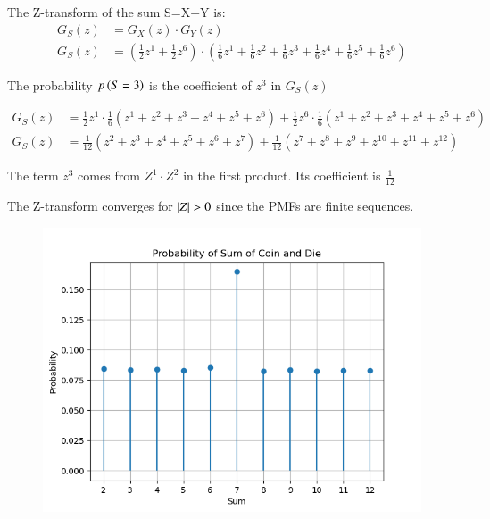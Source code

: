 \documentclass[journal]{IEEEtran}
\begin{document}
The Z-transform of the sum S=X+Y is:
\begin{align}
G_S(z) &= G_X(z) \cdot G_Y(z)\\
G_S(z) &= \left(\frac{1}{2}z^1 + \frac{1}{2}z^6\right) \cdot \left(\frac{1}{6}z^1 + \frac{1}{6}z^2 + \frac{1}{6}z^3 + \frac{1}{6}z^4 + \frac{1}{6}z^5 + \frac{1}{6}z^6\right)
\end{align}



The probability $p\left(S=3\right)$ is the coefficient of $z^3$ in $G_S(z)$



\begin{align}
    G_S(z) &= \frac{1}{2}z^1 \cdot \frac{1}{6}(z^1 + z^2 + z^3 + z^4 + z^5 + z^6) + \frac{1}{2}z^6 \cdot \frac{1}{6}(z^1 + z^2 + z^3 + z^4 + z^5 + z^6)\\
    G_S(z) &= \frac{1}{12}(z^2 + z^3 + z^4 + z^5 + z^6 + z^7) + \frac{1}{12}(z^7 + z^8 + z^9 + z^{10} + z^{11} + z^{12})
\end{align}




The term $z^3$ comes from $Z^1 \cdot Z^2$ in the first product. Its coefficient is $\frac{1}{12}$

The Z-transform converges for $\left\vert Z\right\vert>0$ since the PMFs are finite sequences.
\begin{figure}[h!]
	\centering
	\includegraphics[width=\columnwidth]{figs/Figure_1.png}
	\label{stemplot}
\end{figure}
\end{document}
